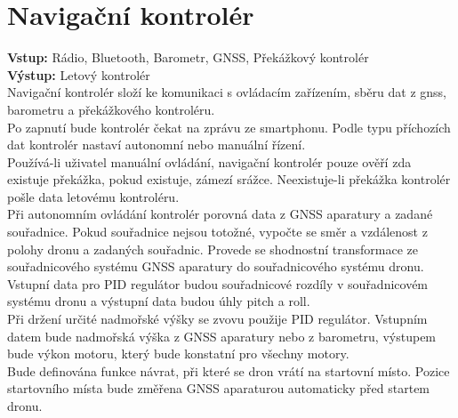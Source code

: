 \section{Navigační kontrolér} 
\textbf{Vstup:} Rádio, Bluetooth, Barometr, GNSS, Překážkový kontrolér\\
\textbf{Výstup:} Letový kontrolér\\
Navigační kontrolér složí ke komunikaci s ovládacím zařízením, sběru dat z gnss, barometru a překážkového kontroléru.\\
Po zapnutí bude kontrolér čekat na zprávu ze smartphonu. Podle typu příchozích dat kontrolér nastaví autonomní nebo manuální řízení.\\
Používá-li uživatel manuální ovládání, navigační kontrolér pouze ověří zda existuje překážka, pokud existuje, zámezí srážce. Neexistuje-li překážka kontrolér pošle data letovému kontroléru.\\
Při autonomním ovládání kontrolér porovná data z GNSS aparatury a zadané souřadnice. Pokud souřadnice nejsou totožné, vypočte se směr a vzdálenost z polohy dronu a zadaných souřadnic. Provede se shodnostní transformace ze souřadnicového systému GNSS aparatury do souřadnicového systému dronu. Vstupní data pro PID regulátor budou souřadnicové rozdíly v souřadnicovém systému dronu a výstupní data budou úhly pitch a roll.\\
Při držení určité nadmořské výšky se zvovu použije PID regulátor. Vstupním datem bude nadmořská výška z GNSS aparatury nebo z barometru, výstupem bude výkon motoru, který bude konstatní pro všechny motory.\\
Bude definována funkce návrat, při které se dron vrátí na startovní místo. Pozice startovního místa bude změřena GNSS aparaturou automaticky před startem dronu.\\

